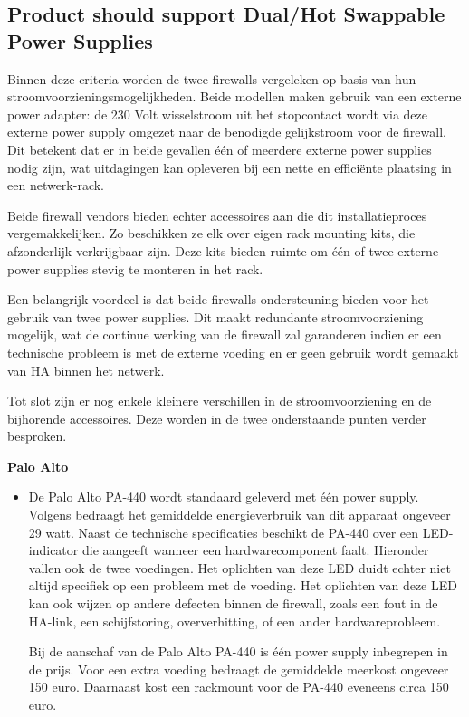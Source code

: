 \subsection{Product should support Dual/Hot Swappable Power Supplies}

Binnen deze criteria worden de twee firewalls vergeleken op basis van hun stroomvoorzieningsmogelijkheden. Beide modellen maken gebruik van een externe power adapter: de 230 Volt wisselstroom uit het stopcontact wordt via deze externe power supply omgezet naar de benodigde gelijkstroom voor de firewall. Dit betekent dat er in beide gevallen één of meerdere externe power supplies nodig zijn, wat uitdagingen kan opleveren bij een nette en efficiënte plaatsing in een netwerk-rack.

\vspace{5mm}
Beide firewall vendors bieden echter accessoires aan die dit installatieproces vergemakkelijken. Zo beschikken ze elk over eigen rack mounting kits, die afzonderlijk verkrijgbaar zijn. Deze kits bieden ruimte om één of twee externe power supplies stevig te monteren in het rack.

\vspace{5mm}
Een belangrijk voordeel is dat beide firewalls ondersteuning bieden voor het gebruik van twee power supplies. Dit maakt redundante stroomvoorziening mogelijk, wat de continue werking van de firewall zal garanderen indien er een technische probleem is met de externe voeding en er geen gebruik wordt gemaakt van HA binnen het netwerk.

\vspace{5mm}
Tot slot zijn er nog enkele kleinere verschillen in de stroomvoorziening en de bijhorende accessoires. Deze worden in de twee onderstaande punten verder besproken.

\textbf{Palo Alto}
\begin{itemize}[label=\textbullet]
    \item De Palo Alto PA-440 wordt standaard geleverd met één power supply. Volgens \textcite{PaloAltoHR2025} bedraagt het gemiddelde energieverbruik van dit apparaat ongeveer 29 watt. Naast de technische specificaties beschikt de PA-440 over een LED-indicator die aangeeft wanneer een hardwarecomponent faalt. Hieronder vallen ook de twee voedingen.
    Het oplichten van deze LED duidt echter niet altijd specifiek op een probleem met de voeding. Het oplichten van deze LED kan ook wijzen op andere defecten binnen de firewall, zoals een fout in de HA-link, een schijfstoring, oververhitting, of een ander hardwareprobleem.
    
    Bij de aanschaf van de Palo Alto PA-440 is één power supply inbegrepen in de prijs. Voor een extra voeding bedraagt de gemiddelde meerkost ongeveer 150 euro. Daarnaast kost een rackmount voor de PA-440 eveneens circa 150 euro.
\end{itemize}

